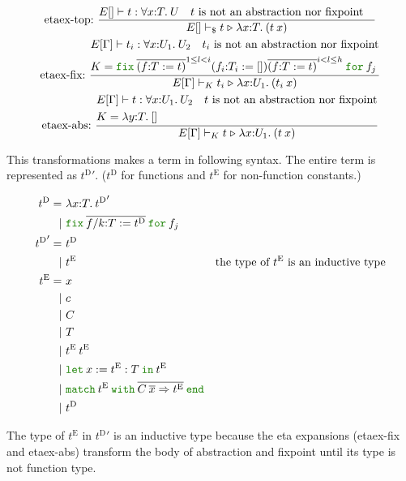 \documentclass[a4paper,fleqn]{article}
\newcommand{\kwlet}{\mbox{\color{mygreen}\ttfamily let}}
\newcommand{\kwin}{\mbox{\color{mygreen}\ttfamily in}}
\newcommand{\kwmatch}{\mbox{\color{mygreen}\ttfamily match}}
\newcommand{\kwwith}{\mbox{\color{mygreen}\ttfamily with}}
\newcommand{\kwend}{\mbox{\color{mygreen}\ttfamily end}}
\newcommand{\kwfix}{\mbox{\color{mygreen}\ttfamily fix}}
\newcommand{\kwfor}{\mbox{\color{mygreen}\ttfamily for}}
\newcommand{\lamT}[3]{\lambda #1\mathord{:}#2.\:#3}
\newcommand{\prodT}[3]{\forall #1\mathord{:}#2.\:#3}
\newcommand{\letin}[3]{\kwlet\:#1:=#2\:\kwin\:#3}
\newcommand{\omatch}[2]{\kwmatch\:#1\:\kwwith\:{#2}\:\kwend}
\newcommand{\ofix}[2]{\kwfix\:{#1}\:\kwfor\:{#2}}
\newcommand{\tD}{{t^\mathrm{D}}}
\newcommand{\tE}{{t^\mathrm{E}}}
\newcommand{\reltri}{\mathrel{\triangleright}}
\newcommand{\repi}[2]{\overline{#1}^{#2}}
\begin{document}
\begin{gather*}
  \text{etaex-top:}~
    \dfrac{
      E[] \vdash t : \prodT{x}{T}{U} \quad
      \text{$t$ is not an abstraction nor fixpoint} \quad
    }{
      E[] \vdash_\$ t \reltri \lamT{x}{T}{(t\:x)}
    } \\
  \text{etaex-fix:}~
    \dfrac{
      \begin{aligned}
        & E[\Gamma] \vdash t_i : \prodT{x}{U_1}{U_2} \quad
          \text{$t_i$ is not an abstraction nor fixpoint} \\
        & K = \ofix{\repi{(f{:}T:=t)}{1\leq l < i} (f_i{:}T_i:=[]) \repi{(f{:}T:=t)}{i < l \leq h}}{f_j}
      \end{aligned}
    }{
        E[\Gamma] \vdash_K t_i \reltri \lamT{x}{U_1}{(t_i\:x)}
    } \\
  \text{etaex-abs:}~
    \dfrac{
      \begin{aligned}
        & E[\Gamma] \vdash t : \prodT{x}{U_1}{U_2} \quad
          \text{$t$ is not an abstraction nor fixpoint} \\
        & K = \lamT{y}{T}{[]}
      \end{aligned}
    }{
      E[\Gamma] \vdash_K t \reltri \lamT{x}{U_1}{(t\:x)}
    }
\end{gather*}

This transformations makes a term in following syntax.
The entire term is represented as $\tD'$.
($\tD$ for functions and $\tE$ for non-function constants.)

\begin{align*}
  \tD =&\ \lamT{x}{T}{\tD'} \\
      |&\ \ofix{\overline{f/k{:}T:=\tD}}{f_j} \\
  \tD' =&\ \tD \\
       |&\ \tE & \text{the type of $\tE$ is an inductive type} \\
  \tE =&\ x \\
    |&\ c \\
    |&\ C \\
    |&\ T \\
    |&\ \tE\:\tE \\
    |&\ \letin{x}{\tE:T}{\tE} \\
    |&\ \omatch{\tE}{\overline{C\:\overline{x}\Rightarrow \tE}} \\
    |&\ \tD \\
\end{align*}

The type of $\tE$ in $\tD'$ is an inductive type because
the eta expansions (etaex-fix and etaex-abs) transform the body of abstraction and fixpoint until its type is not function type.
\end{document}
